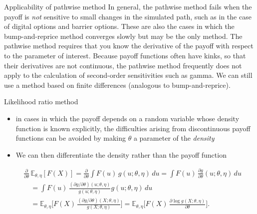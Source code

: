 \documentclass[pdf, handout]{beamer}
\begin{document}
\begin{frame}{Applicability of pathwise method}
In general, the pathwise method fails when the payoff is \emph{not} sensitive to small changes
in the simulated path, such as in the case of digital options and barrier options. These are
also the cases in which the bump-and-reprice method converges slowly but may be the only method.
\vskip4mm\pause
The pathwise method requires that you know the derivative of the payoff with respect to
the parameter of interest. %
\vskip4mm\pause
Because payoff functions often have kinks, so that their derivatives are not continuous,
the pathwise method frequently does not apply to the calculation of second-order sensitivities 
such as gamma. We can still use a method based on finite differences (analogous to bump-and-reprice).
\end{frame}




\begin{frame}{Likelihood ratio method}
\begin{itemize}
\item
in cases in which the payoff depends on a random variable whose density function is known explicitly,
the difficulties arising from discontinuous payoff functions can be avoided by making $\theta$
a parameter of the \emph{density}
\item  We can then differentiate the density rather than the payoff function
\end{itemize}
\begin{align*}
& \frac{\partial}{\partial\theta} \, \mathbb{E}_{\theta,\eta}[F(X)] = \frac{\partial}{\partial\theta} \int F(u)\, g(u; \theta,\eta) \,du
= \int F(u) \, \frac{\partial g}{\partial \theta}(u;\theta,\eta) \,du \\
&\quad = \int F(u) \, \frac{(\partial g/\partial\theta)(u;\theta,\eta)}{g(u;\theta,\eta)} g(u;\theta,\eta) \, du \\
&\quad 
= \mathbb{E}_{\theta,\eta} \Bigg[F(X) \, \frac{(\partial g/\partial\theta)(X;\theta,\eta)}{g(X;\theta,\eta)}\Bigg] = \mathbb{E}_{\theta,\eta}\Bigg[F(X) \, \frac{\partial \log g(X;\theta, \eta)}{\partial \theta} \Bigg].
\end{align*}
\end{frame}
\end{document}
